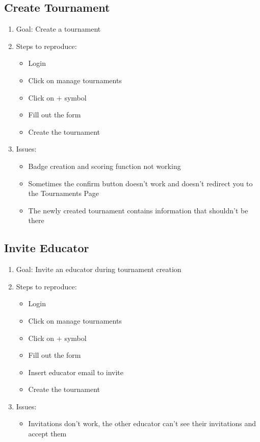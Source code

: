 \subsection{Create Tournament}
\begin{enumerate}
    \item Goal: Create a tournament
    \item Steps to reproduce:
        \begin{itemize}
            \item Login
            \item Click on manage tournaments
            \item Click on $+$ symbol
            \item Fill out the form
            \item Create the tournament
        \end{itemize}
    \item Issues:
        \begin{itemize}
            \item Badge creation and scoring function not working
            \item Sometimes the confirm button doesn't work and doesn't redirect you to the Tournaments Page
            \item The newly created tournament contains information that shouldn't be there
        \end{itemize}
\end{enumerate}

\subsection{Invite Educator}
\begin{enumerate}
    \item Goal: Invite an educator during tournament creation
    \item Steps to reproduce:
        \begin{itemize}
            \item Login
            \item Click on manage tournaments
            \item Click on $+$ symbol
            \item Fill out the form
            \item Insert educator email to invite
            \item Create the tournament
        \end{itemize}
    \item Issues:
        \begin{itemize}
            \item Invitations don't work, the other educator can't see their invitations and accept them
        \end{itemize}
\end{enumerate}

